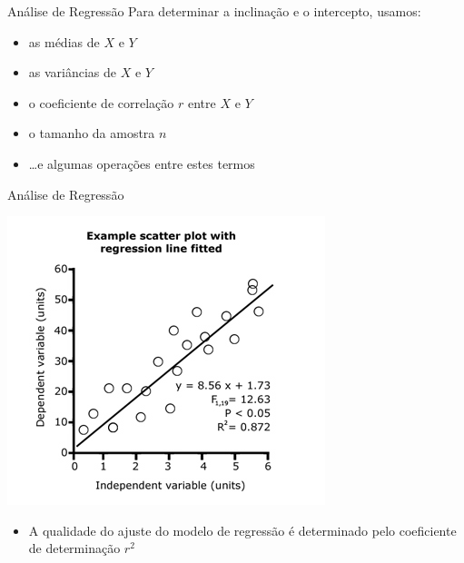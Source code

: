 \documentclass{beamer}
\begin{document}
\begin{frame}{Análise de Regressão}
  Para determinar a inclinação e o intercepto, usamos:
  \begin{itemize}
  \item as médias de $X$ e $Y$
  \item as variâncias de $X$ e $Y$
  \item o coeficiente de correlação $r$ entre $X$ e $Y$
  \item o tamanho da amostra $n$
  \item \ldots e algumas operações entre estes termos
  \end{itemize}
\end{frame}

\begin{frame}{Análise de Regressão}
  \begin{center}
      \includegraphics[height=0.6\textheight]{residuos2}
  \end{center}

  \begin{itemize}
  \item A qualidade do ajuste do modelo de regressão é determinado
    pelo \alert{coeficiente de determinação} $r^2$
  \end{itemize}
\end{frame}


\end{document}
